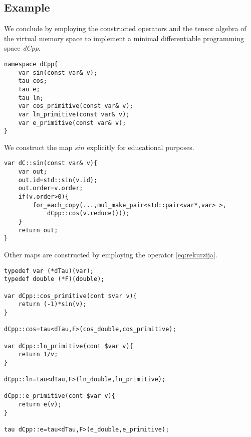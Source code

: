 \subsection{Example}

We conclude by employing the constructed operators and the tensor algebra of the virtual memory space to implement a minimal differentiable programming space \emph{dCpp}.

\begin{lstlisting}
namespace dCpp{
    var sin(const var& v);
    tau cos;
    tau e;
    tau ln;
    var cos_primitive(const var& v);
    var ln_primitive(const var& v);
    var e_primitive(const var& v);
}
\end{lstlisting}

We construct the map $sin$ explicitly for educational purposes.

\begin{lstlisting}
var dC::sin(const var& v){
    var out;
    out.id=std::sin(v.id);
    out.order=v.order;
    if(v.order>0){
    	for_each_copy(...,mul_make_pair<std::pair<var*,var> >,
    		dCpp::cos(v.reduce()));
    }
    return out;
}
\end{lstlisting}
Other maps are constructed by employing the operator \eqref{eq:rekurzija}.
\begin{lstlisting}
typedef var (*dTau)(var);
typedef double (*F)(double);

var dCpp::cos_primitive(cont $var v){
    return (-1)*sin(v);
}

dCpp::cos=tau<dTau,F>(cos_double,cos_primitive);

var dCpp::ln_primitive(cont $var v){
    return 1/v;
}

dCpp::ln=tau<dTau,F>(ln_double,ln_primitive);

dCpp::e_primitive(cont $var v){
    return e(v);
}

tau dCpp::e=tau<dTau,F>(e_double,e_primitive);

\end{lstlisting}

